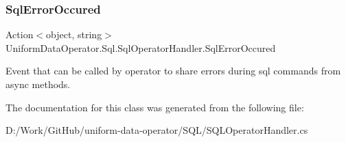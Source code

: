 \subsubsection{\texorpdfstring{Sql\+Error\+Occured}{SqlErrorOccured}}
{\footnotesize\ttfamily Action$<$object, string$>$ Uniform\+Data\+Operator.\+Sql.\+Sql\+Operator\+Handler.\+Sql\+Error\+Occured\hspace{0.3cm}{\ttfamily [static]}}



Event that can be called by operator to share errors during sql commands from async methods. 



The documentation for this class was generated from the following file\+:\begin{DoxyCompactItemize}
\item 
D\+:/\+Work/\+Git\+Hub/uniform-\/data-\/operator/\+S\+Q\+L/S\+Q\+L\+Operator\+Handler.\+cs\end{DoxyCompactItemize}
